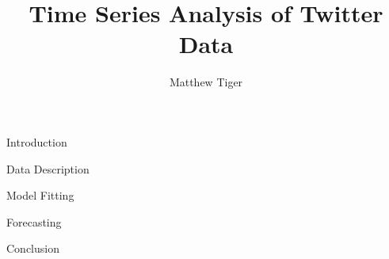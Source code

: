 \documentclass{article}
\title{
  {Time Series Analysis of Twitter Data}\\
}
\author{
  Matthew Tiger \\
}
\begin{document}
\maketitle
\newpage


\begin{section}{Introduction}
  
\end{section}


\begin{section}{Data Description}
  
\end{section}


\begin{section}{Model Fitting}
  
\end{section}


\begin{section}{Forecasting}
  
\end{section}


\begin{section}{Conclusion}
  
\end{section}
\end{document}
